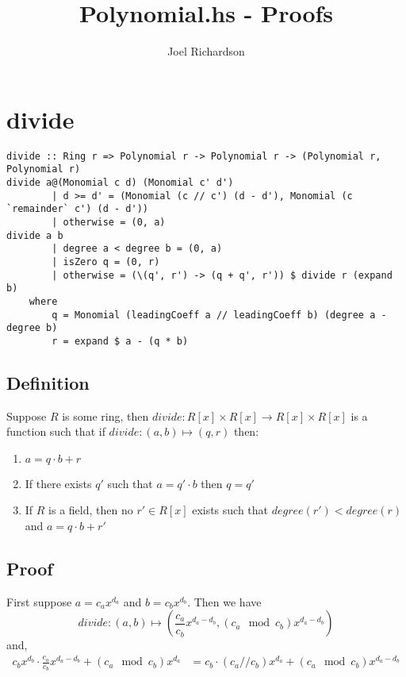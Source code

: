 \documentclass[12pt]{article}
\title{Polynomial.hs - Proofs}
\author{Joel Richardson}
\begin{document}
\maketitle

\section{divide}
\begin{verbatim}
divide :: Ring r => Polynomial r -> Polynomial r -> (Polynomial r, Polynomial r)
divide a@(Monomial c d) (Monomial c' d') 
        | d >= d' = (Monomial (c // c') (d - d'), Monomial (c `remainder` c') (d - d'))
        | otherwise = (0, a)
divide a b
        | degree a < degree b = (0, a)
        | isZero q = (0, r)
        | otherwise = (\(q', r') -> (q + q', r')) $ divide r (expand b)
    where
        q = Monomial (leadingCoeff a // leadingCoeff b) (degree a - degree b)
        r = expand $ a - (q * b)
\end{verbatim}
\subsection*{Definition}
Suppose $R$ is some ring, then $divide : R[x] \times R[x] \to R[x] \times R[x]$ is a function such that if $divide : (a,b) \mapsto (q,r)$ then:
\begin{enumerate}
    \item $a = q\cdot b + r$
    \item If there exists $q'$ such that $a = q'\cdot b$ then $q = q'$
    \item If $R$ is a field, then no $r' \in R[x]$ exists such that $degree(r') < degree(r)$ and $a = q\cdot b + r'$
\end{enumerate}
\subsection*{Proof}
First suppose $a = c_ax^{d_a}$ and $b = c_bx^{d_b}$. Then we have $$divide : (a,b) \mapsto \left(\frac{c_a}{c_b}x^{d_a - d_b}, (c_a \mod c_b)x^{d_a - d_b} \right)$$
and, \begin{align*}
    c_bx^{d_b} \cdot \frac{c_a}{c_b}x^{d_a - d_b} + (c_a \mod c_b)x^{d_a} &= 
    c_b\cdot (c_a // c_b)x^{d_a} + (c_a \mod c_b)x^{d_a - d_b}
\end{align*}
\end{document}
